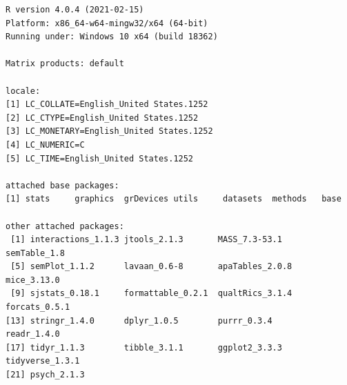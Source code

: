 \documentclass[
  english,
]{book}
\begin{document}
\begin{verbatim}
R version 4.0.4 (2021-02-15)
Platform: x86_64-w64-mingw32/x64 (64-bit)
Running under: Windows 10 x64 (build 18362)

Matrix products: default

locale:
[1] LC_COLLATE=English_United States.1252 
[2] LC_CTYPE=English_United States.1252   
[3] LC_MONETARY=English_United States.1252
[4] LC_NUMERIC=C                          
[5] LC_TIME=English_United States.1252    

attached base packages:
[1] stats     graphics  grDevices utils     datasets  methods   base     

other attached packages:
 [1] interactions_1.1.3 jtools_2.1.3       MASS_7.3-53.1      semTable_1.8      
 [5] semPlot_1.1.2      lavaan_0.6-8       apaTables_2.0.8    mice_3.13.0       
 [9] sjstats_0.18.1     formattable_0.2.1  qualtRics_3.1.4    forcats_0.5.1     
[13] stringr_1.4.0      dplyr_1.0.5        purrr_0.3.4        readr_1.4.0       
[17] tidyr_1.1.3        tibble_3.1.1       ggplot2_3.3.3      tidyverse_1.3.1   
[21] psych_2.1.3       


\end{verbatim}
\end{document}

